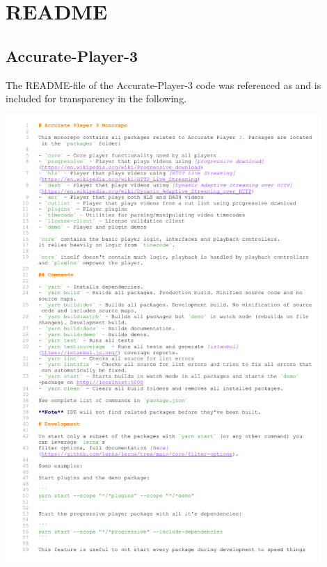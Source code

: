 \documentclass[../MasterThesis.tex]{subfiles}
\begin{document}
	
	
\newpage

\section{README} \label{appendix:readme}


\subsection{Accurate-Player-3} \label{appendix:readmeaccurateplayer}

The README-file of the Accurate-Player-3 code was referenced as \cite{RM_Frontend} and is included for transparency in the following.

\includegraphics[page=1, width=0.9\textwidth]{FE.pdf}
\end{document}
